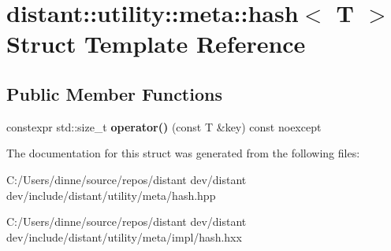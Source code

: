\hypertarget{structdistant_1_1utility_1_1meta_1_1hash}{}\section{distant\+:\+:utility\+:\+:meta\+:\+:hash$<$ T $>$ Struct Template Reference}
\label{structdistant_1_1utility_1_1meta_1_1hash}
\subsection*{Public Member Functions}
\begin{DoxyCompactItemize}
\item 
\mbox{\label{structdistant_1_1utility_1_1meta_1_1hash_a471097e58bb0da13db4c6a9f3f79f208}} 
constexpr std\+::size\+\_\+t {\bfseries operator()} (const T \&key) const noexcept
\end{DoxyCompactItemize}


The documentation for this struct was generated from the following files\+:\begin{DoxyCompactItemize}
\item 
C\+:/\+Users/dinne/source/repos/distant dev/distant dev/include/distant/utility/meta/hash.\+hpp\item 
C\+:/\+Users/dinne/source/repos/distant dev/distant dev/include/distant/utility/meta/impl/hash.\+hxx\end{DoxyCompactItemize}
